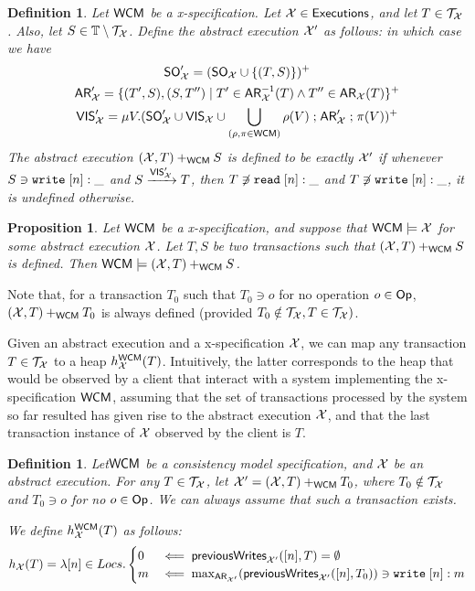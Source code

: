\documentclass[a4paper,UKenglish]{article}%
\newif\ifdraft
\newcommand{\ac}[1]{\ifdraft{}{\color{blue}#1}\else{}\fi}
\theoremstyle{plain}
\newtheorem{definition}[theorem]{Definition}
\newtheorem{proposition}[theorem]{Proposition}
\begin{document}
\begin{definition}
Let $\mathsf{WCM}$ be a x-specification. 
Let $\mathcal{X} \in {\mathsf{Executions}}$, and let $T \in \mathcal{T}_{\mathcal{X}}$. 
Also, let $S \in \mathbb{T} \setminus \mathcal{T}_{\mathcal{X}}$.
Define the abstract execution $\mathcal{X}'$ as follows: 
in which case we have
\begin{gather*}
{\sf{SO}}_{\mathcal{X}}' = ({\sf{SO}}_{\mathcal{X}} \cup \{(T,S)\})^{+}\\
{\sf{AR}}_{\mathcal{X}}' = \{(T', S), (S, T'') \mid T' \in {\sf{AR}}_{\mathcal{X}}^{-1}(T) \wedge T'' \in {\sf{AR}}_{\mathcal{X}}(T)\}^{+}\\
{\mathsf{VIS}}_{\mathcal{X}}' = \mu V.({\sf{SO}}_{\mathcal{X}}' \cup {\mathsf{VIS}}_{\mathcal{X}} \cup \bigcup_{(\rho, \pi \in \mathsf{WCM})} \rho(V) \mathrel{;} {\sf{AR}}_{\mathcal{X}}' \mathrel{;} \pi(V) )^{+}
\end{gather*}
The abstract execution $(\mathcal{X}, T) +_{\mathsf{WCM}} S$ is defined to be exactly $\mathcal{X}'$ 
if whenever $S \ni {{\tt write}}\;[n]:\_$ and $S \xrightarrow{{\mathsf{VIS}}_{\mathcal{X}}'} T$, then $T \not\ni {{\tt read}}\;[n]:\_$ 
and $T \not\ni {{\tt write}}\;[n]:\_$, 
it is undefined otherwise.
\end{definition}

\begin{proposition}
Let $\mathsf{WCM}$ be a x-specification, and suppose that $\mathsf{WCM} \models \mathcal{X}$ for some abstract
execution $\mathcal{X}$. Let $T, S$ be two transactions such that $(\mathcal{X}, T) +_{\mathsf{WCM}} S$ is
defined. Then $\mathsf{WCM} \models (\mathcal{X}, T) +_{\mathsf{WCM}} S$.
\end{proposition}
\ac{Not sure whether it's true. Needs to be checked.}

Note that, for a transaction $T_0$ such that $T_0 \ni o$ for no operation $o \in \mathsf{Op}$, 
$(\mathcal{X}, T) +_{\mathsf{WCM}} T_0$ is always defined (provided $T_0 \notin \mathcal{T}_{\mathcal{X}}, T \in \mathcal{T}_{\mathcal{X}})$.

Given an abstract execution and a x-specification $\mathcal{X}$, we can map any transaction $T \in \mathcal{T}_{\mathcal{X}}$ 
to a heap $h_{\mathcal{X}}^{\mathsf{WCM}}(T)$. Intuitively, the latter corresponds to the heap that would be observed 
by a client that interact with a system implementing the x-specification $\mathsf{WCM}$, assuming that 
the set of transactions processed by the system so far resulted has given rise to the abstract execution 
$\mathcal{X}$, and that the last transaction instance of $\mathcal{X}$ observed by the client is $T$.

\begin{definition}
Let$\mathsf{WCM}$ be a consistency model specification, and $\mathcal{X}$ be an abstract execution. For any $T \in \mathcal{T}_{\mathcal{X}}$, 
let $\mathcal{X}' = (\mathcal{X}, T) +_{\mathsf{WCM}} T_0$, where $T_0 \notin \mathcal{T}_{\mathcal{X}}$ and $T_0 \ni o$ for no 
$o \in \mathsf{Op}$. We can always assume that such a transaction exists. 

We define $h_{\mathcal{X}}^{\mathsf{WCM}}(T)$ as follows:
\[
h_{\mathcal{X}}(T) = \lambda [n] \in Locs.
\begin{cases}
0 &\impliedby \mathsf{previousWrites}_{\mathcal{X}'}([n], T) = \emptyset\\
m & \impliedby \max_{{\sf{AR}}_{\mathcal{X}'}}(\mathsf{previousWrites}_{\mathcal{X}'}([n], T_0)) \ni {{\tt write}}\;[n]: m 
\end{cases}
\]
\end{definition}
\ac{I don't really like this definition, but for the moment it will do...}
\end{document}
